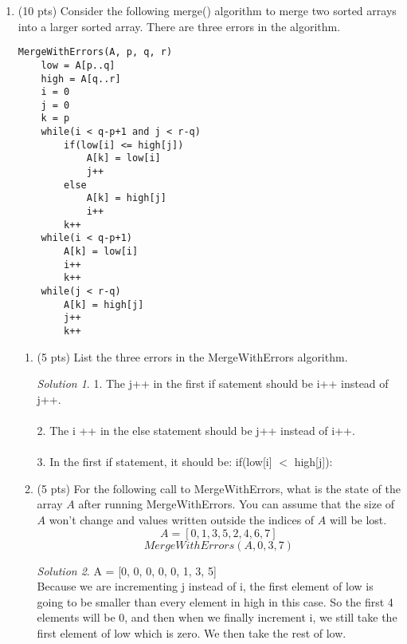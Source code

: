 \documentclass[12pt]{article}
\theoremstyle{remark}
\newtheorem*{solution}{Solution}
\begin{document}
\begin{enumerate}
\item (10 pts) Consider the following merge() algorithm to merge two sorted arrays into a larger sorted array. There are three errors in the algorithm. 
\begin{verbatim}
MergeWithErrors(A, p, q, r)
    low = A[p..q]
    high = A[q..r]
    i = 0
    j = 0
    k = p
    while(i < q-p+1 and j < r-q)
        if(low[i] <= high[j])
            A[k] = low[i]
            j++
        else
            A[k] = high[j]
            i++
        k++
    while(i < q-p+1)
        A[k] = low[i]
        i++
        k++
    while(j < r-q)
        A[k] = high[j]
        j++
        k++
\end{verbatim}
\begin{enumerate}
    \item (5 pts) List the three errors in the MergeWithErrors algorithm.
    \begin{solution}
    1. The j++ in the first if satement should be i++ instead of j++. \\ \\
2. The i ++ in the else statement should be j++ instead of i++. \\ \\
3. In the first if statement, it should be: if(low[i] $<$ high[j]):
    \end{solution}
    \pagebreak
    
    \item (5 pts) For the following call to MergeWithErrors, what is the state of the array $A$ after running MergeWithErrors. You can assume that the size of $A$ won't change and values written outside the indices of $A$ will be lost.
    \\ $$A=[0,1,3,5,2,4,6,7]$$
     $$MergeWithErrors(A, 0, 3, 7)$$
    \begin{solution}
    A = [0, 0, 0, 0, 0, 1, 3, 5] \\ 
Because we are incrementing j instead of i, the first element of low is going to be smaller than every element in high in this case. So the first 4 elements will be 0, and then when we finally increment i, we still take the first element of low which is zero. We then take the rest of low.
    \end{solution}
    \pagebreak
    
\end{enumerate}



\end{enumerate}
\end{document}

